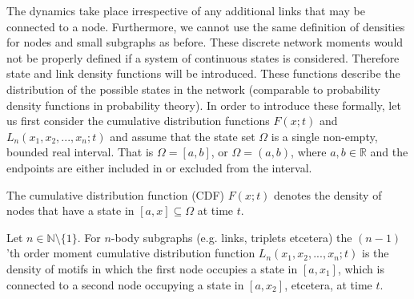 The dynamics take place irrespective of any additional links that may be connected to a node. Furthermore, we cannot use the same definition of densities for nodes and small subgraphs as before. These discrete network moments would not be properly defined if a system of continuous states is considered. Therefore state and link density functions will be introduced. These functions describe the distribution of the possible states in the network (comparable to probability density functions in probability theory). In order to introduce these formally, let us first consider the cumulative distribution functions $F(x;t)$ and $L_n(x_1,x_2,...,x_n;t)$ and assume that the state set $\Omega$ is a single non-empty, bounded real interval. That is $\Omega = [a,b]$, or $\Omega = (a,b)$, where $a,b \in \mathbb{R}$ and the endpoints are either included in or excluded from the interval. 
\begin{definition}
	The cumulative distribution function (CDF) $F(x;t)$ denotes the density of nodes that have a state in $[a, x] \subseteq \Omega$ at time $t$. 
\end{definition}
\begin{definition}
	Let $n\in\mathbb{N}\setminus\{1\}$. For $n$-body subgraphs (e.g. links, triplets etcetera) the $(n-1)$'th order moment cumulative distribution function $L_n(x_1,x_2,...,x_n;t)$ is the density of motifs in which the first node occupies a state in $[a, x_1]$, which is connected to a second node occupying a state in $[a, x_2]$, etcetera, at time $t$.
\end{definition}

